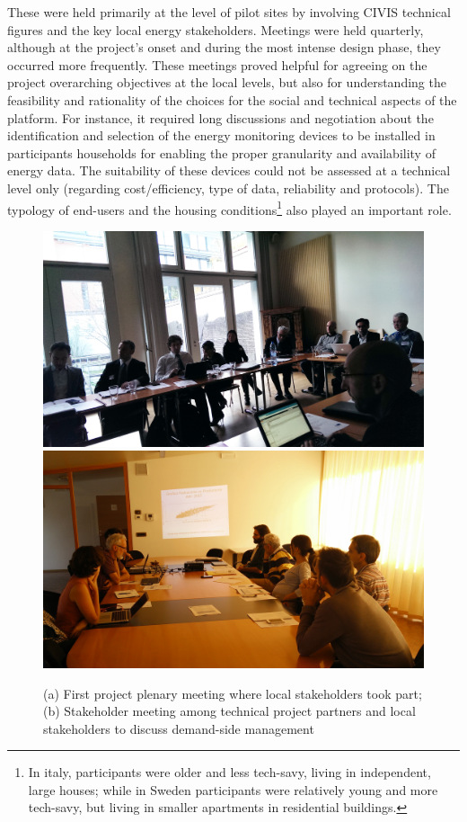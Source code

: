 
These were held primarily at the level of pilot sites by involving CIVIS technical figures and the
key local energy stakeholders. Meetings were held quarterly, although at the project's onset and during
the most intense design phase, they occurred more frequently.
% 
These meetings proved helpful for agreeing on the project overarching objectives at the local levels, but also
for understanding the feasibility and rationality of the choices for the social and technical aspects of the platform.
For instance, it required long discussions and negotiation about the identification and selection of the energy monitoring devices to be installed in
participants households for enabling the proper granularity and availability of energy data. 
The suitability of these devices could not be assessed at a technical level only (regarding cost/efficiency, type of data,
reliability and protocols).
The typology of end-users and the housing conditions\footnote{In italy, participants were older and less tech-savy, living in independent, large houses; while in Sweden participants were relatively young and more tech-savy, but living in smaller apartments in residential buildings.}
also played an important role. 

%
\begin{figure}[b]
      \sidecaption[b]
        \includegraphics[width=.32\linewidth]{img/Stkh_plenary1.jpg}
	        \includegraphics[width=.32\linewidth]{img/Stkh_meeting_tou_crop.jpg} 
    \caption{(a) First project plenary meeting where local stakeholders took part; (b) Stakeholder meeting among technical project partners and
    local stakeholders to discuss demand-side management
}
\label{fig:stkh_meetings}
\end{figure}
%

